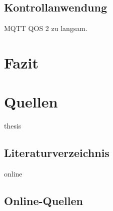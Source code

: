 \documentclass[11pt,a4paper]{report}
\begin{document}
\section{Kontrollanwendung}
MQTT QOS 2 zu langsam.



\chapter{Fazit}\label{chap:fazit}
\blindtext

\chapter{Quellen}\label{chap:source}



\begin{btSect}{thesis} %
\section*{Literaturverzeichnis}
\btPrintCited
\end{btSect}
\begin{btSect}{online}
\section*{Online-Quellen}
\btPrintCited
%
\end{btSect}
\end{document}
